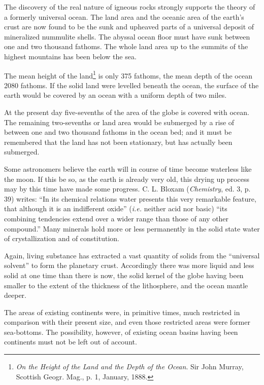 \documentclass[a4paper, 12pt, oneside, landscape]{article}
\begin{document}
The discovery of the real nature of igneous rocks strongly supports the theory of a formerly universal ocean. The land area and the oceanic area of the earth's crust are now found to be the sunk and upheaved parts of a universal deposit of mineralized nummulite shells. The abyssal ocean floor must have sunk between one and two thousand fathoms. The whole land area up to the summits of the highest mountains has been below the sea.

The mean height of the land\footnote{\emph{On the Height of the Land and the Depth of the Ocean}. Sir John Murray, Scottish Geogr. Mag., p. 1, January, 1888.} is only 375 fathoms, the mean depth of the ocean 2080 fathoms. If the solid land were levelled beneath the ocean, the surface of the earth would be covered by an ocean with a uniform depth of two miles.

At the present day five-sevenths of the area of the globe is covered with ocean. The remaining two-sevenths or land area would be submerged by a rise of between one and two thousand fathoms in the ocean bed; and it must be remembered that the land has not been stationary, but has actually been submerged.

Some astronomers believe the earth will in course of time become waterless like the moon. If this be so, as the earth is already very old, this drying up process may by this time have made some progress. C. L. Bloxam (\emph{Chemistry}, ed. 3, p. 39) writes: ``In its chemical relations water presents this very remarkable feature, that although it is an indifferent oxide'' (\emph{i.e.} neither acid nor basic) ``its combining tendencies extend over a wider range than those of any other compound.'' Many minerals hold more or less permanently in the solid state water of crystallization and of constitution.

Again, living substance has extracted a vast quantity of solids from the ``universal solvent'' to form the planetary crust. Accordingly there was more liquid and less solid at one time than there is now, the solid kernel of the globe having been smaller to the extent of the thickness of the lithosphere, and the ocean mantle deeper.

The areas of existing continents were, in primitive times, much restricted in comparison with their present size, and even those restricted areas were former sea-bottoms. The possibility, however, of existing ocean basins having been continents must not be left out of account.
\end{document}
